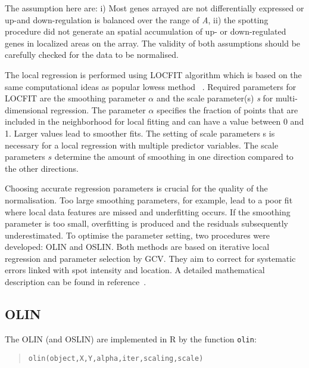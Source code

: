 \documentclass[a4paper,11pt]{article}
\begin{document}
 The assumption here are: i) Most genes arrayed are not differentially expressed or 
up-and down-regulation is balanced over the range of \emph{A},  ii) the spotting procedure did not generate an spatial accumulation of up- or down-regulated genes in localized areas on the array. 
The validity of both assumptions  should be carefully checked for the data to be normalised. 


The local regression is performed using LOCFIT algorithm which is based on the same 
computational ideas as popular lowess method~\cite{loader,cleveland} .  Required parameters for LOCFIT 
are the smoothing parameter $\alpha$  and the scale parameter(s) \emph{s}
for multi-dimensional regression.
The parameter $\alpha$  specifies the fraction of points that are included in the neighborhood for 
local fitting  and can have a  value between 0 and 1. Larger  values lead to smoother fits.  
The setting of scale parameters s is necessary for a local regression with multiple  
predictor variables. The scale parameters $s$  determine the  amount of smoothing in one direction 
compared to the other directions.   


Choosing accurate regression parameters is crucial for the quality of the normalisation. 
Too large smoothing parameters, for example, lead to a poor fit where local data features are missed
and underfitting occurs.  If the smoothing parameter is too small,  overfitting is produced and
the residuals subsequently underestimated. 
To optimise the parameter setting, two procedures were developed: OLIN and OSLIN. Both methods
are based  on iterative local regression and parameter selection by GCV.
 They aim to correct for systematic errors linked with spot intensity and location. A detailed mathematical description can be found in reference~\cite{toni}.


\subsection{OLIN}
The OLIN (and OSLIN) are implemented in R by the function \texttt{olin}:

\begin{quote}
\texttt{olin(object,X,Y,alpha,iter,scaling,scale)}
\end{quote}
\end{document}
